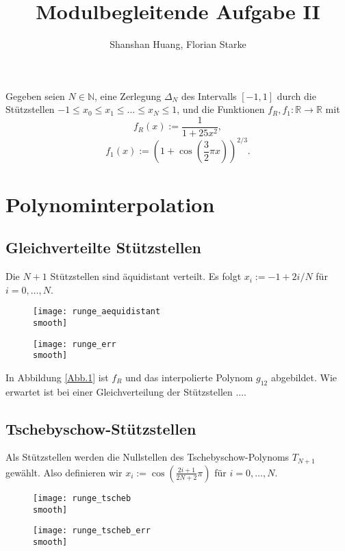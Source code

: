 \documentclass[]{scrartcl}
\title{Modulbegleitende Aufgabe II}
\author{Shanshan Huang, Florian Starke}
\newcommand{\R}{\mathbb{R}}
\newcommand{\N}{\mathbb{N}}
\begin{document}
\def\smooth{_smooth}
	\maketitle
	Gegeben seien $N\in\N$, eine Zerlegung $\Delta_N$ des Intervalls $[-1,1]$ durch die Stützstellen $-1\leq x_0\leq x_1\leq\dots\leq x_N\leq1$, und die Funktionen $f_R,f_1\colon\R\to\R$ mit
	\[f_R(x):=\frac{1}{1+25x^2},\]
	\[f_1(x):=(1+\cos(\frac{3}{2}\pi x))^{2/3}.\]
	\section{Polynominterpolation}
	\subsection{Gleichverteilte Stützstellen}
	Die $N+1$ Stützstellen sind äquidistant verteilt. Es folgt $x_i:=-1+2i/N$ für $i=0,\dots,N$.
	\begin{figure}[h]
		\centering
		\begin{minipage}{0.5\textwidth}
			\texttt{[image: runge\_aequidistant\\smooth]}
			\caption{\label{Abb.1}}
		\end{minipage}
		\begin{minipage}{0.49\textwidth}
			\texttt{[image: runge\_err\\smooth]}
			\caption{\label{Abb.2}}
		\end{minipage}
	\end{figure}
	
	In Abbildung \ref{Abb.1} ist $f_R$ und das interpolierte Polynom $g_{12}$ abgebildet. Wie erwartet ist bei einer Gleichverteilung der Stützstellen ....
	\subsection{Tschebyschow-Stützstellen}
	Als Stützstellen werden die Nullstellen des Tschebyschow-Polynoms $T_{N+1}$ gewählt. Also definieren wir $x_i:=\cos(\frac{2i+1}{2N+2}\pi)$ für $i=0,\dots,N$.
	
	\begin{figure}[h]
		\centering
		\begin{minipage}{0.5\textwidth}
			\texttt{[image: runge\_tscheb\\smooth]}
			\caption{\label{Abb.3}}
		\end{minipage}
		\begin{minipage}{0.49\textwidth}
			\texttt{[image: runge\_tscheb\_err\\smooth]}
			\caption{\label{Abb.4}}
		\end{minipage}
	\end{figure}
	
\end{document}
